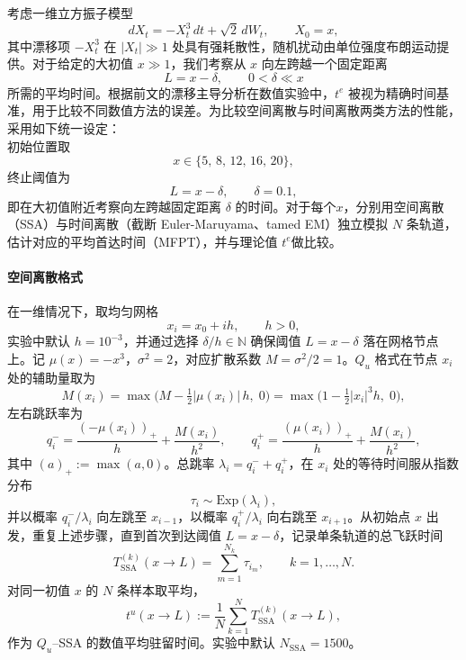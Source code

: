 考虑一维立方振子模型
\begin{equation}\label{eq:cubic-SDE-num}
	dX_t = -X_t^3\,dt + \sqrt{2}\,dW_t,\qquad X_0=x,
\end{equation}
其中漂移项 \(-X_t^3\) 在 \(|X_t| \gg 1 \) 处具有强耗散性，随机扰动由单位强度布朗运动提供。对于给定的大初值 \(x\gg 1\)，我们考察从 \(x\) 向左跨越一个固定距离
\[
L = x - \delta,\qquad 0<\delta\ll x
\]
所需的平均时间。根据前文的漂移主导分析在数值实验中，\(t^e\) 被视为精确时间基准，用于比较不同数值方法的误差。为比较空间离散与时间离散两类方法的性能，采用如下统一设定：\\
初始位置取
	\[
	x\in\{5,\,8,\,12,\,16,\,20\},
	\]
	终止阈值为
	\[
	L=x-\delta,\qquad \delta=0.1,
	\]
即在大初值附近考察向左跨越固定距离 \(\delta\) 的时间。对于每个\(x\)，分别用空间离散（SSA）与时间离散（截断 Euler-Maruyama、tamed EM）独立模拟 \(N\) 条轨道，估计对应的平均首达时间（MFPT），并与理论值 \(t^e\)做比较。


\paragraph{空间离散格式}

在一维情况下，取均匀网格
\[
x_i = x_0 + i h,\qquad h>0,
\]
实验中默认 \(h=10^{-3}\)，并通过选择 \(\delta/h\in\mathbb{N}\) 确保阈值 \(L=x-\delta\) 落在网格节点上。记 \(\mu(x)=-x^3\)，\(\sigma^2=2\)，对应扩散系数 \(M=\sigma^2/2=1\)。\(Q_{u}\) 格式在节点 \(x_i\) 处的辅助量取为
\begin{equation}\label{eq:M-def-num}
	M(x_i)
	= \max\!\Big( M - \tfrac12|\mu(x_i)|\,h,\; 0\Big)
	= \max\!\Big( 1 - \tfrac12|x_i|^{3}h,\; 0\Big),
\end{equation}
左右跳跃率为
\begin{equation}\label{eq:qpm-num}
	q_i^- = \frac{(-\mu(x_i))_+}{h} + \frac{M(x_i)}{h^2},\qquad
	q_i^+ = \frac{(\mu(x_i))_+}{h} + \frac{M(x_i)}{h^2},
\end{equation}
其中 \((a)_+ := \max(a,0)\)。总跳率 \(\lambda_i = q_i^-+q_i^+\)，在 \(x_i\) 处的等待时间服从指数分布
\[
\tau_i\sim\mathrm{Exp}(\lambda_i),
\]
并以概率 \(q_i^-/\lambda_i\) 向左跳至 \(x_{i-1}\)，以概率 \(q_i^+/\lambda_i\) 向右跳至 \(x_{i+1}\)。从初始点 \(x\) 出发，重复上述步骤，直到首次到达阈值 \(L=x-\delta\)，记录单条轨道的总飞跃时间
\[
T^{(k)}_{\mathrm{SSA}}(x\to L)
= \sum_{m=1}^{N_k}\tau_{i_m},\qquad k=1,\dots,N.
\]
对同一初值 \(x\) 的 \(N\) 条样本取平均，
\[
t^u(x\to L)
:= \frac{1}{N}\sum_{k=1}^{N}
T^{(k)}_{\mathrm{SSA}}(x\to L),
\]
作为 \(Q_{u}\)–SSA 的数值平均驻留时间。实验中默认 \(N_{\mathrm{SSA}}=1500\)。


